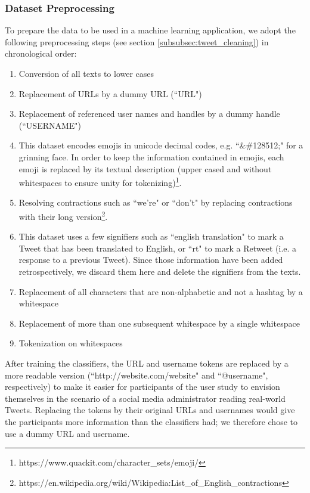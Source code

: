 \subsubsection{Dataset Preprocessing}
To prepare the data to be used in a machine learning application, we adopt the following preprocessing steps (see section \ref{subsubsec:tweet_cleaning}) in chronological order:
\begin{enumerate}
	\item Conversion of all texts to lower cases
	\item Replacement of URLs by a dummy URL (``URL")
	\item Replacement of referenced user names and handles by a dummy handle (``USERNAME")
	\item This dataset encodes emojis in unicode decimal codes, e.g. ``\&\#128512;" for a grinning face. In order to keep the information contained in emojis, each emoji is replaced by its textual description (upper cased and without whitespaces to ensure unity for tokenizing)\footnote{https://www.quackit.com/character\_sets/emoji/}.
	\item Resolving contractions such as ``we're" or ``don't" by replacing contractions with their long version\footnote{https://en.wikipedia.org/wiki/Wikipedia:List\_of\_English\_contractions}.
	\item This dataset uses a few signifiers such as ``english translation" to mark a Tweet that has been translated to English, or ``rt" to mark a Retweet (i.e. a response to a previous Tweet). Since those information have been added retrospectively, we discard them here and delete the signifiers from the texts.
	\item Replacement of all characters that are non-alphabetic and not a hashtag by a whitespace
	\item Replacement of more than one subsequent whitespace by a single whitespace
	\item Tokenization on whitespaces
\end{enumerate}
After training the classifiers, the URL and username tokens are replaced by a more readable version (``http://website.com/website" and ``@username", respectively) to make it easier for participants of the user study to envision themselves in the scenario of a social media administrator reading real-world Tweets. Replacing the tokens by their original URLs and usernames would give the participants more information than the classifiers had; we therefore chose to use a dummy URL and username.\newline

